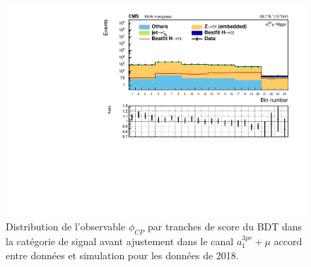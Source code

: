 \begin{figure}
        \centering
        \includegraphics[scale=0.6]{Chapitre7/Images/histSigdataMC2018dp_prefit.pdf} 
        \vspace{0.5ex}
    \caption{Distribution de l'observable $\phi_{CP}$ par tranches de score du BDT dans la catégorie de signal avant ajustement dans le canal $a_1^{3pr}+\mu$ accord entre données et simulation pour les données de 2018.}
\end{figure}

\clearpage



